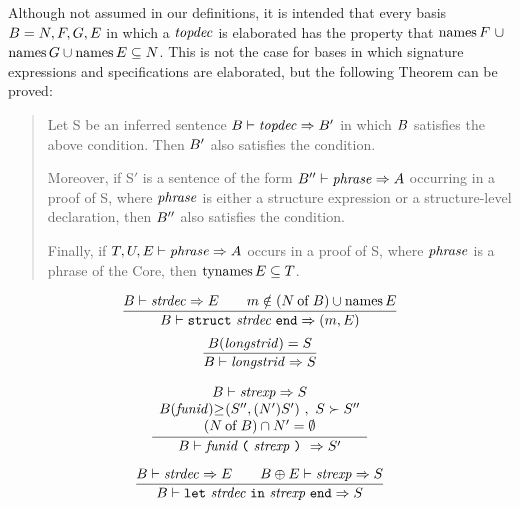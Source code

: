 Although not assumed in our definitions, it is intended that every basis
$B=N,F,G,E$ in which a ${\it topdec}$ is elaborated has the property
that $\mathop{\rm names}\nolimits F\ \cup$\linebreak$\mathop{\rm names}\nolimits G\cup\mathop{\rm names}\nolimits E\subseteq N$. This is not
the case for bases in which signature expressions and specifications are
elaborated, but the following Theorem can be proved:
\begin{quote}
Let S be an inferred sentence $B\vdash{\it topdec}\Rightarrow B'$ in which $B$ satisfies
the above condition. Then $B'$ also satisfies the condition.

Moreover, if S$'$ is a sentence of the form
$B''\vdash{\it phrase}\Rightarrow A$ occurring in a proof of S, where ${\it phrase}$ is
either a structure expression or a structure-level declaration, then $B''$
also satisfies the condition.

Finally, if $T,U,E\vdash{\it phrase}\Rightarrow A$ occurs
in a proof of S, where ${\it phrase}$ is a phrase of the Core, then
$\mathop{\rm tynames}\nolimits E\subseteq T$.
\end{quote}
%
%
\begin{equation}	%
\label{generative-strexp-rule}
\frac{\B\ts\strdec\ra\E\qquad\m\notin(\of{\N}{\B})\cup\NamesFcn\E}
     {\B\ts\encstrexp\ra(\m,\E)}\index{39.2}
\end{equation}
\begin{equation}	%
\frac{\B(\longstrid)=\S}
     {\B\ts\longstrid\ra\S}
\end{equation}

\vspace{6pt}
\begin{equation}		%
\label{functor-application-rule}
\frac{ \begin{array}{c}
        \B\ts\strexp\ra\S\\
        \funsiginst{\B(\funid)}{}{(\S'',(\N')\S')}\ ,
                                                    \ \S\succ\S''\\
        (\of{\N}{\B})\cap\N'=\emptyset
       \end{array}
     }
     {\B\ts\funappstr\ra\S'}
\end{equation}

\vspace{6pt}
\begin{equation}	%
\label{letstrexp-rule}
\frac{\B\ts\strdec\ra\E\qquad\B\oplus\E\ts\strexp\ra\S}
     {\B\ts\letstrexp\ra\S}
\end{equation}

